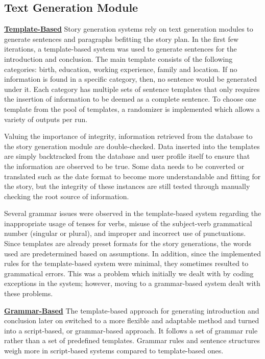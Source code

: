 \subsection{Text Generation Module}
\underline{\textbf{Template-Based}}
Story generation systems rely on text generation modules to generate sentences and paragraphs befitting the story plan. In the first few iterations, a template-based system was used to generate sentences for the introduction and conclusion. The main template consists of the following categories: birth, education, working experience, family and location. If no information is found in a specific category, then, no sentence would be generated under it. Each category has multiple sets of sentence templates that only requires the insertion of information to be deemed as a complete sentence. To choose one template from the pool of templates, a randomizer is implemented which allows a variety of outputs per run.

Valuing the importance of integrity, information retrieved from the database to the story generation module are double-checked. Data inserted into the templates are simply backtracked from the database and user profile itself to ensure that the information are observed to be true. Some data needs to be converted or translated such as the date format to become more understandable and fitting for the story, but the integrity of these instances are still tested through manually checking the root source of information.

Several grammar issues were observed in the template-based system regarding the inappropriate usage of tenses for verbs, misuse of the subject-verb grammatical number (singular or plural), and improper and incorrect use of punctuations. Since templates are already preset formats for the story generations, the words used are predetermined based on assumptions. In addition, since the implemented rules for the template-based system were minimal, they sometimes resulted to grammatical errors. This was a problem which initially we dealt with by coding exceptions in the system; however, moving to a grammar-based system dealt with these problems.

\underline{\textbf{Grammar-Based}}
The template-based approach for generating introduction and conclusion later on switched to a more flexible and adaptable method and turned into a script-based, or grammar-based approach. It follows a set of grammar rule rather than a set of predefined templates. Grammar rules and sentence structures weigh more in script-based systems compared to template-based ones.

